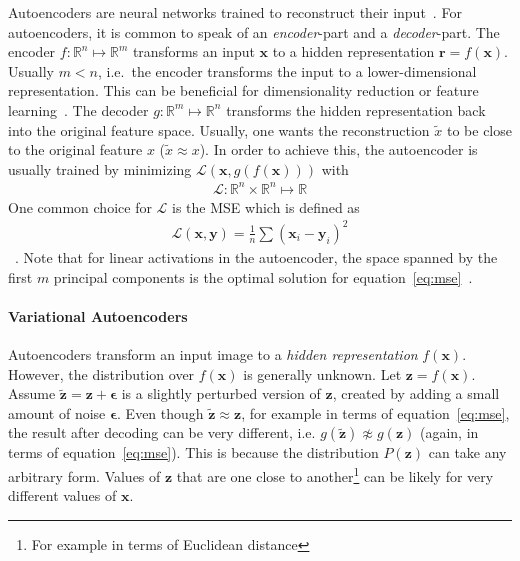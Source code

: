 Autoencoders are neural networks trained to reconstruct their input~\citep[p. 499]{Goodfellow-et-al-2016}.
For autoencoders, it is common to speak of an \textit{encoder}-part and a \textit{decoder}-part.
The encoder $f: \mathbb{R}^n \mapsto \mathbb{R}^m$ transforms an input $\bm{x}$ to a hidden representation $\bm{r} = f(\bm{x})$.
Usually $m < n$, i.e.\ the encoder transforms the input to a lower-dimensional representation.
This can be beneficial for dimensionality reduction or feature learning~\citep[p. 499]{Goodfellow-et-al-2016}.
The decoder $g: \mathbb{R}^m \mapsto \mathbb{R}^n$ transforms the hidden representation back into the original feature space.
Usually, one wants the reconstruction $\tilde{x}$ to be close to the original feature $x$ ($\tilde{x} \approx x$).
In order to achieve this, the autoencoder is usually trained by minimizing $\mathcal{L}(\bm{x}, g(f(\bm{x})))$ with
\begin{align}
    \mathcal{L}: \mathbb{R}^n \times \mathbb{R}^n \mapsto \mathbb{R}
\end{align}
One common choice for $\mathcal{L}$ is the \ac{MSE} which is defined as
\begin{align}
    \mathcal{L}(\bm{x}, \bm{y}) = \frac{1}{n}\sum (\bm{x}_i - \bm{y}_i)^2 \label{eq:mse}
\end{align}~\citep[p. 106]{Goodfellow-et-al-2016}.
Note that for linear activations in the autoencoder, the space spanned by the first $m$ principal components is the optimal solution for equation~\ref{eq:mse}~\citep{chicco2014deep}.

\paragraph{Variational Autoencoders}

Autoencoders transform an input image to a \textit{hidden representation} $f(\bm{x})$.
However, the distribution over $f(\bm{x})$ is generally unknown.
Let $\bm{z} = f(\bm{x})$.
Assume $\bm{\tilde{z}} = \bm{z} + \bm{\epsilon}$ is a slightly perturbed version of $\bm{z}$, created by adding a small amount of noise $\bm{\epsilon}$.
Even though $\bm{\tilde{z}} \approx \bm{z}$, for example in terms of equation~\ref{eq:mse}, the result after decoding can be very different, i.e. $g(\bm{\tilde{z}}) \not\approx g(\bm{z})$ (again, in terms of equation~\ref{eq:mse}).
This is because the distribution $P(\bm{z})$ can take any arbitrary form.
Values of $\bm{z}$ that are one close to another\footnote{For example in terms of Euclidean distance} can be likely for very different values of $\bm{x}$.


